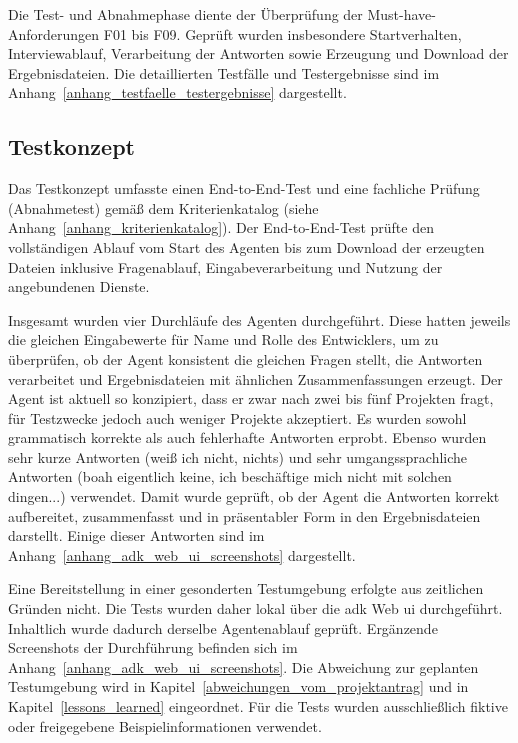\documentclass[
  10pt,
  ngerman,
  a4paper,
  toc=graduated,
  numbers=noenddot,
  headings=standardclasses,
  nonumberlist
]{scrartcl}
\begin{document}
Die Test- und Abnahmephase diente der Überprüfung der Must-have-Anforderungen F01 bis F09. Geprüft wurden insbesondere Startverhalten, Interviewablauf, Verarbeitung der Antworten sowie Erzeugung und Download der Ergebnisdateien. Die detaillierten Testfälle und Testergebnisse sind im Anhang~\ref{anhang_testfaelle_testergebnisse} dargestellt.

\subsection{Testkonzept}
\label{testkonzept}
Das Testkonzept umfasste einen End-to-End-Test und eine fachliche Prüfung (Abnahmetest) gemäß dem Kriterienkatalog (siehe Anhang~\ref{anhang_kriterienkatalog}). Der End-to-End-Test prüfte den vollständigen Ablauf vom Start des Agenten bis zum Download der erzeugten Dateien inklusive Fragenablauf, Eingabeverarbeitung und Nutzung der angebundenen Dienste.

Insgesamt wurden vier Durchläufe des Agenten durchgeführt. Diese hatten jeweils die gleichen Eingabewerte für Name und Rolle des Entwicklers, um zu überprüfen, ob der Agent konsistent die gleichen Fragen stellt, die Antworten verarbeitet und Ergebnisdateien mit ähnlichen Zusammenfassungen erzeugt. Der Agent ist aktuell so konzipiert, dass er zwar nach zwei bis fünf Projekten fragt, für Testzwecke jedoch auch weniger Projekte akzeptiert. Es wurden sowohl grammatisch korrekte als auch fehlerhafte Antworten erprobt. Ebenso wurden sehr kurze Antworten (\glqq weiß ich nicht\grqq{}, \glqq nichts\grqq{}) und sehr umgangssprachliche Antworten (\glqq boah eigentlich keine, ich beschäftige mich nicht mit solchen dingen...\grqq{}) verwendet. Damit wurde geprüft, ob der Agent die Antworten korrekt aufbereitet, zusammenfasst und in präsentabler Form in den Ergebnisdateien darstellt. Einige dieser Antworten sind im Anhang~\ref{anhang_adk_web_ui_screenshots} dargestellt.

Eine Bereitstellung in einer gesonderten Testumgebung erfolgte aus zeitlichen Gründen nicht. Die Tests wurden daher lokal über die \gls{adk} Web \gls{ui} durchgeführt. Inhaltlich wurde dadurch derselbe Agentenablauf geprüft. Ergänzende Screenshots der Durchführung befinden sich im Anhang~\ref{anhang_adk_web_ui_screenshots}. Die Abweichung zur geplanten Testumgebung wird in Kapitel~\ref{abweichungen_vom_projektantrag} und in Kapitel~\ref{lessons_learned} eingeordnet. Für die Tests wurden ausschließlich fiktive oder freigegebene Beispielinformationen verwendet.
\end{document}
